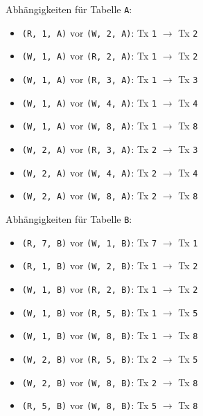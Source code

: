 \documentclass[a4paper,11pt]{report}
\begin{document}
    Abhängigkeiten für Tabelle \texttt{A}:

    \begin{itemize}
        \item \texttt{(R, 1, A)} vor \texttt{(W, 2, A)}: Tx \texttt{1} $\rightarrow$ Tx \texttt{2}
        \item \texttt{(W, 1, A)} vor \texttt{(R, 2, A)}: Tx \texttt{1} $\rightarrow$ Tx \texttt{2}
        \item \texttt{(W, 1, A)} vor \texttt{(R, 3, A)}: Tx \texttt{1} $\rightarrow$ Tx \texttt{3}
        \item \texttt{(W, 1, A)} vor \texttt{(W, 4, A)}: Tx \texttt{1} $\rightarrow$ Tx \texttt{4}
        \item \texttt{(W, 1, A)} vor \texttt{(W, 8, A)}: Tx \texttt{1} $\rightarrow$ Tx \texttt{8}
        \item \texttt{(W, 2, A)} vor \texttt{(R, 3, A)}: Tx \texttt{2} $\rightarrow$ Tx \texttt{3}
        \item \texttt{(W, 2, A)} vor \texttt{(W, 4, A)}: Tx \texttt{2} $\rightarrow$ Tx \texttt{4}
        \item \texttt{(W, 2, A)} vor \texttt{(W, 8, A)}: Tx \texttt{2} $\rightarrow$ Tx \texttt{8}
    \end{itemize}

    Abhängigkeiten für Tabelle \texttt{B}:

    \begin{itemize}
        \item \texttt{(R, 7, B)} vor \texttt{(W, 1, B)}: Tx \texttt{7} $\rightarrow$ Tx \texttt{1}
        \item \texttt{(R, 1, B)} vor \texttt{(W, 2, B)}: Tx \texttt{1} $\rightarrow$ Tx \texttt{2}
        \item \texttt{(W, 1, B)} vor \texttt{(R, 2, B)}: Tx \texttt{1} $\rightarrow$ Tx \texttt{2}
        \item \texttt{(W, 1, B)} vor \texttt{(R, 5, B)}: Tx \texttt{1} $\rightarrow$ Tx \texttt{5}
        \item \texttt{(W, 1, B)} vor \texttt{(W, 8, B)}: Tx \texttt{1} $\rightarrow$ Tx \texttt{8}
        \item \texttt{(W, 2, B)} vor \texttt{(R, 5, B)}: Tx \texttt{2} $\rightarrow$ Tx \texttt{5}
        \item \texttt{(W, 2, B)} vor \texttt{(W, 8, B)}: Tx \texttt{2} $\rightarrow$ Tx \texttt{8}
        \item \texttt{(R, 5, B)} vor \texttt{(W, 8, B)}: Tx \texttt{5} $\rightarrow$ Tx \texttt{8}
    \end{itemize}
\end{document}
